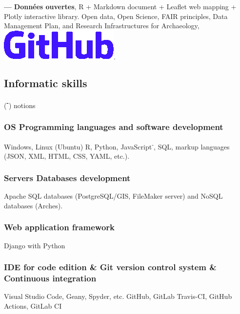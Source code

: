 \documentclass{article}
\begin{document}
\smallbreak
\textbf{--- }\textbf{Donn\'{e}es ouvertes}, \textsf{R} + \textsf{Markdown} document + \textsf{Leaflet} web mapping + \textsf{Plotly} interactive library. Open data, Open Science, FAIR principles, Data Management Plan, and Research Infrastructures for Archaeology, \href{https://zoometh.github.io/LOD}{\includegraphics[scale=0.12]{github-rect.png}}.

\subsection*{Informatic skills}
\begin{center}(\textbf{\textsuperscript{-}}) notions \end{center}
\smallbreak

\subsubsection*{OS {\textbar} Programming languages and software development}

Windows, Linux (Ubuntu) \textbf{{\textbar}} \textsf{R}, \textsf{Python}, \textsf{JavaScript\textsuperscript{-}}, SQL, markup languages (JSON, XML, HTML, CSS, YAML, etc.).

\subsubsection*{Servers {\textbar} Databases development} 

Apache \textbf{{\textbar}} SQL databases (PostgreSQL/GIS, FileMaker server) and NoSQL databases (Arches).

\subsubsection*{Web application framework} 

\textsf{Django} with \textsf{Python}

\subsubsection*{IDE for code edition \& Git version control system \& Continuous integration} 

Visual Studio Code, Geany, Spyder, etc. \textbf{{\textbar}} GitHub, GitLab \textbf{{\textbar}} Travis-CI, GitHub Actions, GitLab CI
\end{document}
